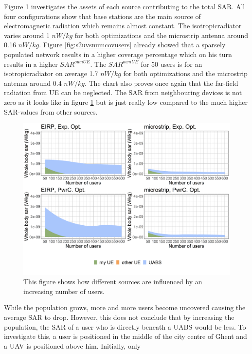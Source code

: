 Figure \ref{fig:s2fourSourcesMatrix} investigates the assets of each source contributing to the total \gls{SAR}. All four 
configurations show that base stations are the main source of electromagnetic radiation which remains almost constant.
The \gls{isotropicradiator} varies around 1 $nW/kg$ for both optimizations and the microstrip antenna around 0.16 $nW/kg$.
Figure \ref{fig:s2uvsnumcovusers} already 
showed that a sparsely populated network results in a higher coverage percentage which on his turn results in a higher $SAR^{ownUE}$. 
The  $SAR^{ownUE}$ for 50 users is for an \gls{isotropicradiator} on average 1.7 $nW/kg$ for both optimizations and the microstrip antenna around 0.4 $nW/kg$.
The chart also proves once again that the far-field radiation from \gls{UE} can be neglected. The \gls{SAR} from 
neighbouring devices is not zero as it looks like in figure \ref{fig:s2fourSourcesMatrix} but is just really low compared to the much higher
\gls{SAR}-values from other sources.
\begin{figure}[h!]
\centering
  \includegraphics[width=\textwidth/6*5]{../results/s2/uFourSources.png}
  \caption{This figure shows how different sources are influenced by an increasing number of users. }
  \label{fig:s2fourSourcesMatrix}
\end{figure}
While the population grows, more and more users become uncovered causing the average SAR to drop. 
However, this does not conclude that  by increasing the population, the SAR of a user who is directly beneath a \gls{UABS} would be less.
To investigate this, a user is positioned in the middle of the city centre of Ghent and a \gls{UAV} is positioned above him. Initially, only 
